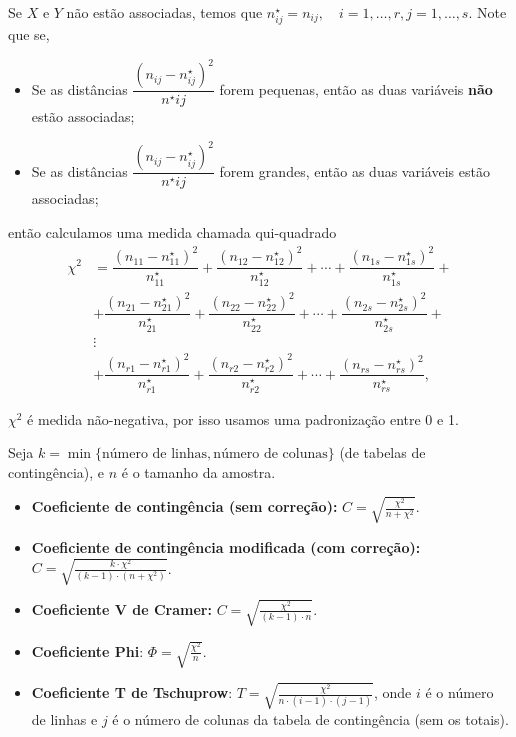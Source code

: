\documentclass[
  10pt,
  ignorenonframetext,
]{beamer}
\providecommand{\tightlist}{%
  \setlength{\itemsep}{0pt}\setlength{\parskip}{0pt}}\usepackage{longtable,booktabs,array}
\begin{document}
\begin{frame}
Se \(X\) e \(Y\) não estão associadas, temos que
\(n^\star_{ij}=n_{ij}, \quad i=1,\dots, r,j=1,\dots, s\). Note que se,

\begin{itemize}
    \item Se as distâncias $\dfrac{(n_{ij}-n^\star_{ij})^2}{n^\star{ij}}$ forem pequenas, então as duas variáveis \textbf{não} estão associadas;
    \item Se as distâncias $\dfrac{(n_{ij}-n^\star_{ij})^2}{n^\star{ij}}$ forem grandes, então as duas variáveis estão associadas;
\end{itemize}

então calculamos uma medida chamada qui-quadrado \begin{align*}
\chi^2 &= \dfrac{(n_{11} - n^\star_{11})^2}{n^\star_{11}} + \dfrac{(n_{12} - n^\star_{12})^2}{n^\star_{12}} + \cdots + \dfrac{(n_{1s} - n^\star_{1s})^2}{n^\star_{1s}} + \\
&+ \dfrac{(n_{21} - n^\star_{21})^2}{n^\star_{21}} + \dfrac{(n_{22} - n^\star_{22})^2}{n^\star_{22}} + \cdots + \dfrac{(n_{2s} - n^\star_{2s})^2}{n^\star_{2s}} + \\
&\vdots\\
&+\dfrac{(n_{r1} - n^\star_{r1})^2}{n^\star_{r1}} + \dfrac{(n_{r2} - n^\star_{r2})^2}{n^\star_{r2}} + \cdots + \dfrac{(n_{rs} - n^\star_{rs})^2}{n^\star_{rs}},
\end{align*}
\end{frame}

\begin{frame}
\(\chi^2\) é medida não-negativa, por isso usamos uma padronização entre
0 e 1.

Seja \(k=\min\{\text{número de linhas}, \text{número de colunas}\}\) (de
tabelas de contingência), e \(n\) é o tamanho da amostra.

\begin{itemize}
\tightlist
\item
  \textbf{Coeficiente de contingência (sem correção):}
  \(C=\sqrt{\frac{\chi^2}{n + \chi^2}}\).
\item
  \textbf{Coeficiente de contingência modificada (com correção):}
  \(C=\sqrt{\frac{k \cdot \chi^2}{(k-1)\cdot (n + \chi^2)}}\).
\item
  \textbf{Coeficiente V de Cramer:}
  \(C=\sqrt{\frac{\chi^2}{(k-1)\cdot n}}\).
\item
  \textbf{Coeficiente Phi}: \(\Phi = \sqrt{\frac{\chi^2}{n}}\).
\item
  \textbf{Coeficiente T de Tschuprow}:
  \(T = \sqrt{\frac{\chi^2}{n \cdot (i - 1) \cdot (j-1)}}\), onde \(i\)
  é o número de linhas e \(j\) é o número de colunas da tabela de
  contingência (sem os totais).
\end{itemize}
\end{frame}
\end{document}
